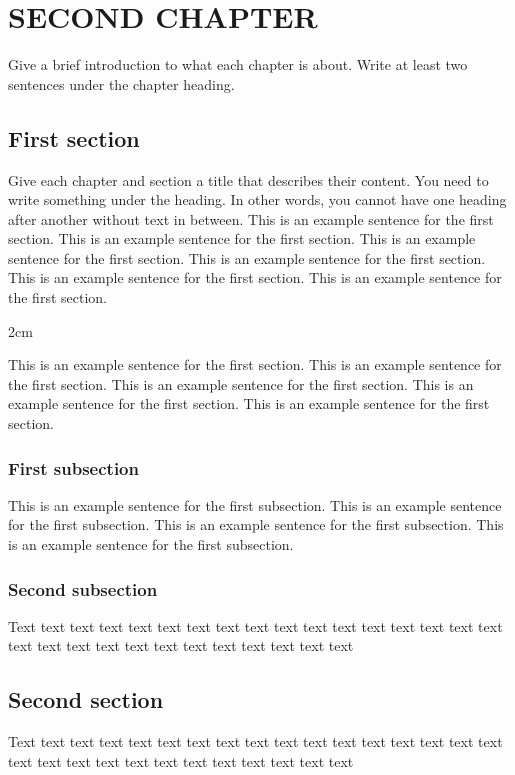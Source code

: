 \chapter{SECOND CHAPTER}
Give a brief introduction to what each chapter is about. Write at least two sentences under the chapter heading.

\section{First section}
Give each chapter and section a title that describes their content. You need to write something under the heading. In other words, you cannot have one heading after another without text in between. This is an example sentence for the first section. This is an example sentence for the first section. This is an example sentence for the first section. This is an example sentence for the first section. This is an example sentence for the first section. This is an example sentence for the first section.

\begin{adjustwidth}{2cm}{}
\end{adjustwidth}

This is an example sentence for the first section. This is an example sentence for the first section. This is an example sentence for the first section. This is an example sentence for the first section. This is an example sentence for the first section.

\subsection{First subsection}
This is an example sentence for the first subsection. This is an example sentence for the first subsection. This is an example sentence for the first subsection. This is an example sentence for the first subsection.

\subsection{Second subsection}
Text text text text text text text text text text text text text text text text text text text text text text text text text text text text text

\section{Second section}
Text text text text text text text text text text text text text text text text text text text text text text text text text text text text text